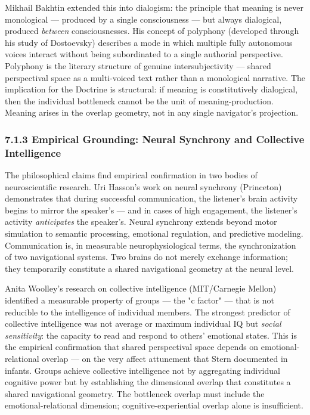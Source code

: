 Mikhail Bakhtin extended this into dialogism: the principle that meaning is never monological — produced by a single consciousness — but always dialogical, produced \textit{between} consciousnesses. His concept of polyphony (developed through his study of Dostoevsky) describes a mode in which multiple fully autonomous voices interact without being subordinated to a single authorial perspective. Polyphony is the literary structure of genuine intersubjectivity — shared perspectival space as a multi-voiced text rather than a monological narrative. The implication for the Doctrine is structural: if meaning is constitutively dialogical, then the individual bottleneck cannot be the unit of meaning-production. Meaning arises in the overlap geometry, not in any single navigator's projection.


\subsubsection*{7.1.3 Empirical Grounding: Neural Synchrony and Collective Intelligence}


The philosophical claims find empirical confirmation in two bodies of neuroscientific research. Uri Hasson's work on neural synchrony (Princeton) demonstrates that during successful communication, the listener's brain activity begins to mirror the speaker's — and in cases of high engagement, the listener's activity \textit{anticipates} the speaker's. Neural synchrony extends beyond motor simulation to semantic processing, emotional regulation, and predictive modeling. Communication is, in measurable neurophysiological terms, the synchronization of two navigational systems. Two brains do not merely exchange information; they temporarily constitute a shared navigational geometry at the neural level.


Anita Woolley's research on collective intelligence (MIT/Carnegie Mellon) identified a measurable property of groups — the "c factor" — that is not reducible to the intelligence of individual members. The strongest predictor of collective intelligence was not average or maximum individual IQ but \textit{social sensitivity}: the capacity to read and respond to others' emotional states. This is the empirical confirmation that shared perspectival space depends on emotional-relational overlap — on the very affect attunement that Stern documented in infants. Groups achieve collective intelligence not by aggregating individual cognitive power but by establishing the dimensional overlap that constitutes a shared navigational geometry. The bottleneck overlap must include the emotional-relational dimension; cognitive-experiential overlap alone is insufficient.


